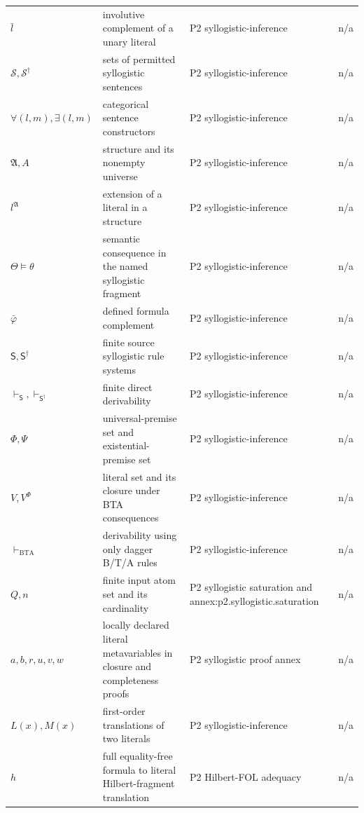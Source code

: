 \begin{longtable}{@{}p{}p{}p{}p{}@{}}
\(\bar l\) & involutive complement of a unary literal & P2 syllogistic-\allowbreak{}inference & n/a \\
\(\mathcal S,\allowbreak \mathcal S^\dagger\) & sets of permitted syllogistic sentences & P2 syllogistic-\allowbreak{}inference & n/a \\
\(\forall(l,\allowbreak m),\allowbreak \exists(l,\allowbreak m)\) & categorical sentence constructors & P2 syllogistic-\allowbreak{}inference & n/a \\
\(\mathfrak A,\allowbreak A\) & structure and its nonempty universe & P2 syllogistic-\allowbreak{}inference & n/a \\
\(l^{\mathfrak A}\) & extension of a literal in a structure & P2 syllogistic-\allowbreak{}inference & n/a \\
\(\Theta\models\theta\) & semantic consequence in the named syllogistic fragment & P2 syllogistic-\allowbreak{}inference & n/a \\
\(\bar\varphi\) & defined formula complement & P2 syllogistic-\allowbreak{}inference & n/a \\
\(\mathsf S,\allowbreak \mathsf S^\dagger\) & finite source syllogistic rule systems & P2 syllogistic-\allowbreak{}inference & n/a \\
\(\vdash_{\mathsf S},\allowbreak \vdash_{\mathsf S^\dagger}\) & finite direct derivability & P2 syllogistic-\allowbreak{}inference & n/a \\
\(\Phi,\allowbreak \Psi\) & universal-premise set and existential-premise set & P2 syllogistic-\allowbreak{}inference & n/a \\
\(V,\allowbreak V^\Phi\) & literal set and its closure under BTA consequences & P2 syllogistic-\allowbreak{}inference & n/a \\
\(\vdash_{\mathrm{BTA}}\) & derivability using only dagger B/T/A rules & P2 syllogistic-\allowbreak{}inference & n/a \\
\(Q,\allowbreak n\) & finite input atom set and its cardinality & P2 syllogistic saturation and annex:\allowbreak{}p2.\allowbreak{}syllogistic.\allowbreak{}saturation & n/a \\
\(a,\allowbreak b,\allowbreak r,\allowbreak u,\allowbreak v,\allowbreak w\) & locally declared literal metavariables in closure and completeness proofs & P2 syllogistic proof annex & n/a \\
\(L(x),\allowbreak M(x)\) & first-order translations of two literals & P2 syllogistic-\allowbreak{}inference & n/a \\
\(h\) & full equality-free formula to literal Hilbert-fragment translation & P2 Hilbert-\allowbreak{}FOL adequacy & n/a \\

\end{longtable}

